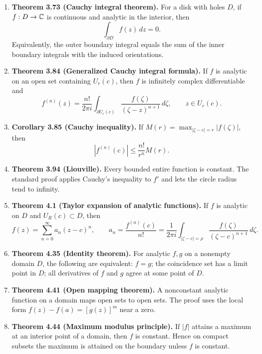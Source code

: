 \documentclass{article}
\begin{document}
\begin{enumerate}
  \item \textbf{Theorem 3.73 (Cauchy integral theorem).}
  For a disk with holes $D$, if $f:D\to\mathbb{C}$ is continuous and analytic in
  the interior, then
  \[
    \int_{\partial D} f(z)\,dz=0.
  \]
  Equivalently, the outer boundary integral equals the sum of the inner
  boundary integrals with the induced orientations.

  \item \textbf{Theorem 3.84 (Generalized Cauchy integral formula).}
  If $f$ is analytic on an open set containing $\overline{U_r(c)}$, then
  $f$ is infinitely complex differentiable and
  \[
    f^{(n)}(z)=\frac{n!}{2\pi i}
    \int_{\partial U_r(c)}\frac{f(\zeta)}{(\zeta-z)^{n+1}}\,d\zeta,
    \qquad z\in U_r(c).
  \]

  \item \textbf{Corollary 3.85 (Cauchy inequality).}
  If $M(r)=\max_{|\zeta-c|=r}|f(\zeta)|$, then
  \[
    |f^{(n)}(c)|\le \frac{n!}{r^n}M(r).
  \]

  \item \textbf{Theorem 3.94 (Liouville).}
  Every bounded entire function is constant.  The standard proof applies
  Cauchy's inequality to $f'$ and lets the circle radius tend to infinity.

  \item \textbf{Theorem 4.1 (Taylor expansion of analytic functions).}
  If $f$ is analytic on $D$ and $U_R(c)\subset D$, then
  \[
    f(z)=\sum_{n=0}^{\infty}a_n(z-c)^n,\qquad
    a_n=\frac{f^{(n)}(c)}{n!}
    =\frac{1}{2\pi i}\int_{|\zeta-c|=\rho}
      \frac{f(\zeta)}{(\zeta-c)^{n+1}}\,d\zeta.
  \]

  \item \textbf{Theorem 4.35 (Identity theorem).}
  For analytic $f,g$ on a nonempty domain $D$, the following are equivalent:
  $f=g$; the coincidence set has a limit point in $D$; all derivatives of
  $f$ and $g$ agree at some point of $D$.

  \item \textbf{Theorem 4.41 (Open mapping theorem).}
  A nonconstant analytic function on a domain maps open sets to open sets.
  The proof uses the local form $f(z)-f(a)=[g(z)]^m$ near a zero.

  \item \textbf{Theorem 4.44 (Maximum modulus principle).}
  If $|f|$ attains a maximum at an interior point of a domain, then $f$ is
  constant.  Hence on compact subsets the maximum is attained on the
  boundary unless $f$ is constant.


\end{enumerate}
\end{document}
